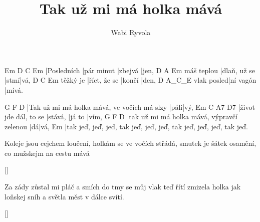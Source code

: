 \documentclass{song}
\author{Wabi Ryvola}
\title{Tak už mi má holka mává}
\begin{document}
\strophe
Em          D          C       Em
|Posledních |pár minut |zbejvá |jen,
           D            A    Em
máš teplou |dlaň, už se |stmí|vá,
         D            C      Em
těžký je |říct, že se |končí |den,
           D         A_C_E
vlak posled|ní vagón |mívá.
\endstrophe

G                                           F    D
|Tak už mi má holka mává, ve vočích má slzy |páli|vý,
Em                    C       A7     D7
|život jde dál, to se |stává, |já to |vím,
G                                          F  D
|tak už mi má holka mává, výpravčí zelenou |dá|vá,
Em
|tak jeď, jeď, jeď, tak jeď, jeď, jeď, tak jeď, jeď, jeď, tak jeď.
\endstrophe

\strophe*
Koleje jsou cejchem loučení,
holkám se ve vočích střádá,
smutek je šátek osamění,
co mužskejm na cestu mává
\endstrophe

\ref{}

\strophe*
Za zády zůstal mi pláč a smích
do tmy se můj vlak teď řítí
zmizela holka jak loňskej sníh
a světla měst v dálce svítí.
\endstrophe

\ref{}
\end{document}
